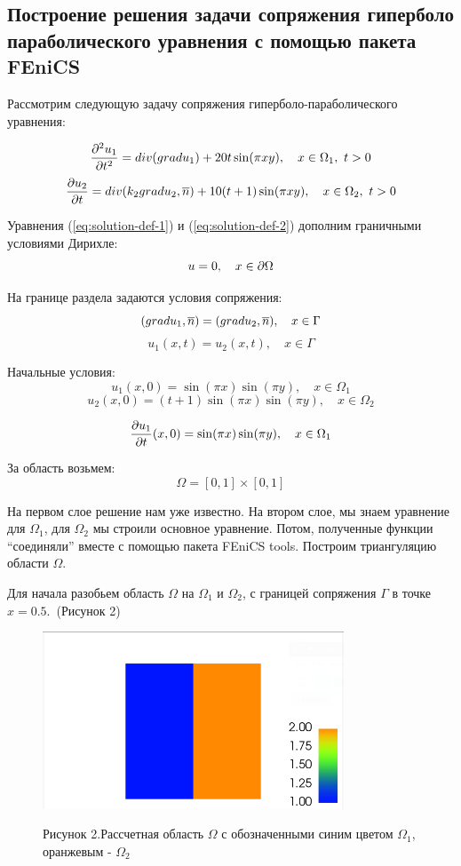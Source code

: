 \subsection{Построение решения задачи сопряжения гиперболо параболического уравнения с помощью пакета FEniCS}

Рассмотрим следующую задачу сопряжения гиперболо-параболического уравнения:

\begin{equation}
   {\frac{\partial^2 u_1}{\partial t^2}} = div(gradu_1) + 20t\sin(\pi xy), \quad x \in \Omega_1,~t > 0  
    \label{eq:solution-def-1}
\end{equation}
\begin{equation}
    {\frac{\partial u_2}{\partial t}} = div(k_2 grad u_2, \overline{n}) + 10(t+1)\sin(\pi xy),\quad x\in \Omega_2,~t > 0
    \label{eq:solution-def-2}
\end{equation}

Уравнения (\ref{eq:solution-def-1}) и (\ref{eq:solution-def-2}) дополним граничными условиями Дирихле:
$$ u = 0, \quad x \in {\partial \Omega} $$

На границе раздела задаются условия сопряжения:
$$(gradu_1, \overline{n}) = (gradu_2, \overline{n}), \quad x \in \Gamma  $$
$$ u_1(x,t) = u_2(x, t), \quad x \in \Gamma $$

Начальные условия:
$$ u_1(x, 0) = \sin(\pi x)\sin(\pi y), \quad x \in \Omega_1  $$
$$ u_2(x, 0) = (t+1)\sin(\pi x)\sin(\pi y), \quad x \in \Omega_2  $$

$$ {\frac{\partial u_1}{\partial t}}(x, 0) = \sin(\pi x)\sin(\pi y), \quad x \in \Omega_1 $$

За область возьмем:
$$ \Omega = [0,1]\times[0,1]$$


На первом слое решение нам уже известно. На втором слое, мы знаем уравнение для $\Omega_1$, для $\Omega_2$ мы строили основное уравнение. Потом, полученные функции ``соединяли'' вместе с помощью пакета FEniCS tools. Построим триангуляцию области $\Omega$. 

Для начала разобьем область $\Omega$ на $\Omega_1$ и $\Omega_2$, с границей сопряжения $\Gamma$ в точке $x = 0.5$.~(Рисунок 2)

\begin{figure}[H]
      \centering
      \includegraphics[width=0.8\textwidth]{plots/domains.png}\\
      \centering\caption*{Рисунок 2.Рассчетная область $\Omega$ с обозначенными синим цветом $\Omega_1$, оранжевым - $\Omega_2$}
\end{figure}

